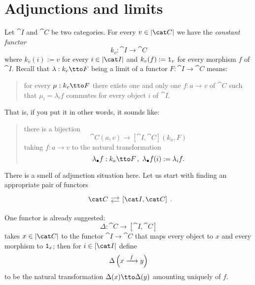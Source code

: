 
\section{Adjunctions and limits}

Let \(\cat I\) and \(\cat C\) be two categories. For every
\(v \in \obj{\cat C}\) we have the {\em constant functor}
\[k_v : \cat I \to \cat C\] where \(k_v(i) := v\) for every
\(i \in \obj{\cat I}\) and \(k_v(f) := \mathtt 1_v\) for every morphism
\(f\) of \(\cat I\). Recall that \(\lambda : k_v \tto F\) being a limit of a
functor \(F : \cat I \to \cat C\) means:
\begin{quotation}
  for every \(\mu : k_v \tto F\) there exists one and only one
  \(f : a \to v\) of \(\cat C\) such that \(\mu_i = \lambda_i f\)
  commutes for every object \(i\) of \(\cat I\).
\end{quotation}
That is, if you put it in other words, it sounds like:
\begin{quotation}
  there is a bijection
  \[\cat C(a, v) \to [\cat I, \cat C](k_a, F)\]
  taking \(f : a \to v\) to the natural transformation
  \[\lambda_\bullet f : k_a \tto F\,, \ \lambda_\bullet f (i):= \lambda_i f .\]
\end{quotation}

There is a smell of adjunction situation here. Let us start with
finding an appropriate pair of functors
\[\begin{tikzcd}[column sep=small] \cat C \ar[r, shift left] & {[\cat
      I, \cat C]} \ar[l, shift left] \end{tikzcd} .\]

One functor is already suggested:
\[\Delta : \cat C \to [\cat I, \cat C]\]
takes \(x \in \obj{\cat C}\) to the functor \(\cat I \to \cat C\) that
maps every object to \(x\) and every morphism to \(\mathtt 1_x\); then for
\(i \in \obj{\cat I}\) define
\[\Delta \left(x \xrightarrow{\ f\ } y\right)\]
to be the natural transformation \(\Delta(x) \tto \Delta(y)\) amounting uniquely
of \(f\).

